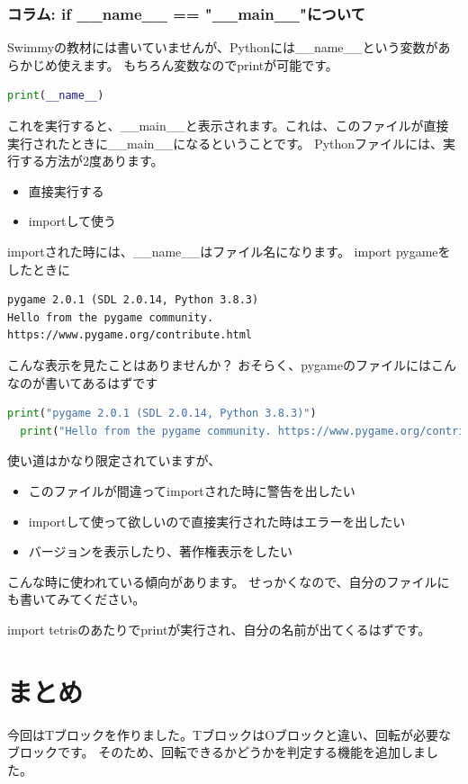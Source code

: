 \subsubsection{コラム: if \_\_name\_\_ == "\_\_main\_\_"について}
Swimmyの教材には書いていませんが、Pythonには\_\_name\_\_という変数があらかじめ使えます。
もちろん変数なのでprintが可能です。
\begin{lstlisting}[caption=\_\_name\_\_の使い方,language=Python]
print(__name__)
\end{lstlisting}
これを実行すると、\_\_main\_\_と表示されます。これは、このファイルが直接実行されたときに\_\_main\_\_になるということです。
Pythonファイルには、実行する方法が2度あります。
\begin{itemize}
  \item 直接実行する
  \item importして使う
\end{itemize}
importされた時には、\_\_name\_\_はファイル名になります。
import pygameをしたときに
\begin{verbatim}
pygame 2.0.1 (SDL 2.0.14, Python 3.8.3)
Hello from the pygame community. https://www.pygame.org/contribute.html
\end{verbatim}
こんな表示を見たことはありませんか？
おそらく、pygameのファイルにはこんなのが書いてあるはずです
\begin{lstlisting}[caption=pygameのファイルの一部,language=Python]
  print("pygame 2.0.1 (SDL 2.0.14, Python 3.8.3)")
  print("Hello from the pygame community. https://www.pygame.org/contribute.html")
\end{lstlisting}
使い道はかなり限定されていますが、
\begin{itemize}
  \item このファイルが間違ってimportされた時に警告を出したい
  \item importして使って欲しいので直接実行された時はエラーを出したい
  \item バージョンを表示したり、著作権表示をしたい
\end{itemize}
こんな時に使われている傾向があります。
せっかくなので、自分のファイルにも書いてみてください。

import tetrisのあたりでprintが実行され、自分の名前が出てくるはずです。

\section{まとめ}
今回はTブロックを作りました。TブロックはOブロックと違い、回転が必要なブロックです。
そのため、回転できるかどうかを判定する機能を追加しました。